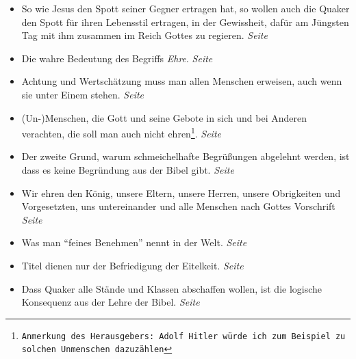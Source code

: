 \begin{itemize}
\begin{itemize}
 \item So wie Jesus den Spott seiner Gegner ertragen hat, so wollen auch die
Quaker den Spott für ihren Lebensstil ertragen, in der Gewissheit, dafür am
Jüngsten Tag mit ihm zusammen im Reich Gottes zu regieren.
 \dotfill \textit{Seite~\pageref{ref:09_10_spott}}\\

 \item Die wahre Bedeutung des Begriffs \textit{Ehre}.
 \dotfill \textit{Seite~\pageref{ref:09_12_ehre}}\\

 \item Achtung und Wertschätzung muss man allen Menschen erweisen, auch wenn sie
unter Einem stehen.
 \dotfill \textit{Seite~\pageref{ref:09_18_ehre}}\\

 \item (Un-)Menschen, die Gott und seine Gebote in sich und bei Anderen
verachten, die soll man auch nicht ehren\footnote{\texttt{Anmerkung des
Herausgebers: Adolf Hitler würde ich zum Beispiel zu solchen Unmenschen dazuzählen}}.
 \dotfill \textit{Seite~\pageref{ref:09_19_ehre}}\\

 \item Der zweite Grund, warum schmeichelhafte Begrüßungen abgelehnt werden, ist
dass es keine Begründung aus der Bibel gibt.
 \dotfill \textit{Seite~\pageref{ref:09_20_zeiter_grund}}\\

 \item Wir ehren den König, unsere Eltern,
unsere Herren, unsere Obrigkeiten
und Vorgesetzten, uns untereinander und alle
Menschen nach Gottes Vorschrift
 \dotfill \textit{Seite~\pageref{ref:09_20_koenig}}\\

 \item Was man "`feines Benehmen"' nennt in der Welt.
 \dotfill \textit{Seite~\pageref{ref:09_26_feines_benemen}}\\

 \item Titel dienen nur der Befriedigung der Eitelkeit.
 \dotfill \textit{Seite~\pageref{ref:09_31_heuchelei}}\\

 \item Dass Quaker alle Stände und Klassen abschaffen wollen, ist die logische
Konsequenz aus der Lehre der Bibel.
 \dotfill \textit{Seite
\pageref{ref:09_35_staende_abschaffen}}\\


\end{itemize}
\end{itemize}
